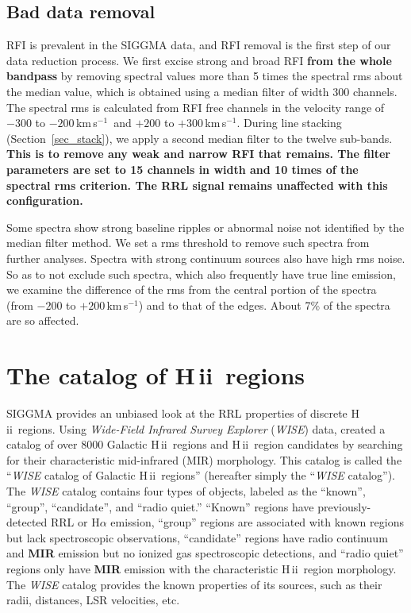 \documentclass[manuscript]{aastex61}
\newcommand{\hii}{{\rm H\,}{{\sc ii}}}
\newcommand{\kms}{\,km\,s$^{-1}$}
\begin{document}
\subsection{Bad data removal} \label{sec_rfi}
RFI is prevalent in the SIGGMA data, and RFI removal is the first step of our data reduction process.
We first excise strong and broad RFI \textbf{from the whole bandpass} by removing spectral values more than 5 times the spectral rms about the median value, which is obtained using a median filter of width 300 channels.
The spectral rms is calculated from RFI free channels in the velocity range of $-300$ to $-200$\kms\ and $+200$ to $+300$\kms.
During line stacking (Section~\ref{sec_stack}), we apply a second median filter to the twelve sub-bands. 
\textbf{
This is to remove any weak and narrow RFI that remains.
The filter parameters are set to 15 channels in width and 10 times of the spectral rms criterion. 
The RRL signal remains unaffected with this configuration.
}

Some spectra show strong baseline ripples or abnormal noise not identified by the median filter method.
We set a rms threshold to remove such spectra from further analyses.
Spectra with strong continuum sources also have high rms noise. 
So as to not exclude such spectra, which also frequently have true line emission, we examine the difference of the rms from the central portion of the spectra (from $-200$ to $+200$\kms) and to that of the edges.
About 7\% of the spectra are so affected.

\section{The catalog of \hii\ regions} \label{sec_cata}

SIGGMA provides an unbiased look at the RRL properties of discrete \hii\ regions.
Using {\it Wide-Field Infrared Survey Explorer} ({\it WISE}) data, \citet{Anderson2014} created a catalog of over 8000 Galactic \hii\ regions and \hii\ region candidates by searching for their characteristic mid-infrared (MIR) morphology.  This catalog is called the ``{\it WISE} catalog of Galactic \hii\ regions'' (hereafter simply the ``{\it WISE} catalog'').
The {\it WISE} catalog contains four types of objects, labeled as the ``known'', ``group'', ``candidate'', and ``radio quiet.''
``Known'' regions have previously-detected RRL or H$\alpha$ emission, ``group'' regions are associated with known regions but lack spectroscopic observations, ``candidate'' regions have radio continuum and \textbf{MIR} emission but no ionized gas spectroscopic detections, and ``radio quiet'' regions only have \textbf{MIR} emission with the characteristic \hii\ region morphology.
The {\it WISE} catalog provides the known properties of its sources, such as their radii, distances, LSR velocities, etc.
\end{document}
